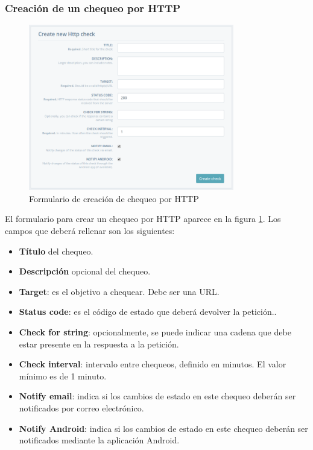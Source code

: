 \subsubsection{Creación de un chequeo por HTTP}

\begin{figure}[hbtp]
  \centering
  \includegraphics[width=0.8\textwidth]{apendice_manual_usuario/pantalla_crear_http.png}
  \caption{Formulario de creación de chequeo por HTTP}
  \label{fig:crear-http}
\end{figure}

El formulario para crear un chequeo por HTTP aparece en la figura
\ref{fig:crear-http}. Los campos que deberá rellenar son los siguientes:

\begin{itemize}
\item \textbf{Título} del chequeo.
\item \textbf{Descripción} opcional del chequeo.
\item \textbf{Target}: es el objetivo a chequear. Debe ser una URL.
\item \textbf{Status code}: es el código de estado que deberá devolver la petición..
\item \textbf{Check for string}: opcionalmente, se puede indicar una cadena que
  debe estar presente en la respuesta a la petición.
\item \textbf{Check interval}: intervalo entre chequeos, definido en minutos. El
  valor mínimo es de 1 minuto.
\item \textbf{Notify email}: indica si los cambios de estado en este chequeo
  deberán ser notificados por correo electrónico.
\item \textbf{Notify Android}: indica si los cambios de estado en este chequeo
  deberán ser notificados mediante la aplicación Android.
\end{itemize}


